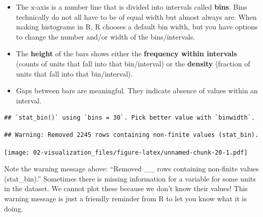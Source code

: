 \documentclass[
]{book}
\newenvironment{Shaded}{\begin{snugshade}}{\end{snugshade}}
\newcommand{\DataTypeTok}[1]{\textcolor[rgb]{0.13,0.29,0.53}{#1}}
\newcommand{\KeywordTok}[1]{\textcolor[rgb]{0.13,0.29,0.53}{\textbf{#1}}}
\newcommand{\NormalTok}[1]{#1}
\newcommand{\OperatorTok}[1]{\textcolor[rgb]{0.81,0.36,0.00}{\textbf{#1}}}
\newcommand{\StringTok}[1]{\textcolor[rgb]{0.31,0.60,0.02}{#1}}
\providecommand{\tightlist}{%
  \setlength{\itemsep}{0pt}\setlength{\parskip}{0pt}}
\begin{document}
\begin{itemize}
\tightlist
\item
  The x-axis is a number line that is divided into intervals called \textbf{bins}. Bins technically do not all have to be of equal width but almost always are. When making histograms in R, R chooses a default bin width, but you have options to change the number and/or width of the bins/intervals.
\item
  The \textbf{height} of the bars shows either the \textbf{frequency within intervals} (counts of units that fall into that bin/interval) or the \textbf{density} (fraction of units that fall into that bin/interval).
\item
  Gaps between bars are meaningful. They indicate absence of values within an interval.
\end{itemize}

\begin{Shaded}
\end{Shaded}

\begin{verbatim}
## `stat_bin()` using `bins = 30`. Pick better value with `binwidth`.
\end{verbatim}

\begin{verbatim}
## Warning: Removed 2245 rows containing non-finite values (stat_bin).
\end{verbatim}

\texttt{[image: 02-visualization\_files/figure-latex/unnamed-chunk-20-1.pdf]}

Note the warning message above: ``Removed \_\_ rows containing non-finite values (stat\_bin).'' Sometimes there is missing information for a variable for some units in the dataset. We cannot plot these because we don't know their values! This warning message is just a friendly reminder from R to let you know what it is doing.
\end{document}

